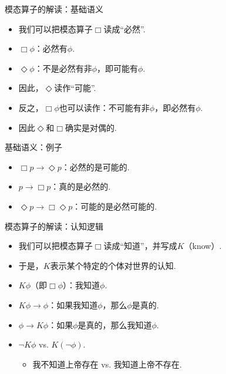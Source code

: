     \begin{frame}{模态算子的解读：基础语义}
    \begin{itemize}
        \item 我们可以把模态算子$\Box$读成“必然”.
        \item $\Box\phi$：必然有$\phi$.
        \item $\Diamond\phi$：不是必然有非$\phi$，即可能有$\phi$.
        \item 因此，$\Diamond$读作“可能”.
        \item 反之，$\Box\phi$也可以读作：不可能有非$\phi$，即必然有$\phi$.
        \item 因此$\Diamond$和$\Box$确实是对偶的.
    \end{itemize}
    \end{frame}
    \begin{frame}{基础语义：例子}
    \begin{itemize}
        \item $\Box p\to\Diamond p$：必然的是可能的.
        \item $p\to\Box p$：真的是必然的.
        \item $\Diamond p\to\Box\Diamond p$：可能的是必然可能的.
    \end{itemize}
    \end{frame}
    \begin{frame}{模态算子的解读：认知逻辑}
    \begin{itemize}
        \item 我们可以把模态算子$\Box$读成“知道”，并写成$K$（know）.
        \item 于是，$K$表示某个特定的个体对世界的认知.
        \item $K\phi$（即$\Box\phi$）：我知道$\phi$.
        \item $K\phi\to\phi$：如果我知道$\phi$，那么$\phi$是真的.
        \item $\phi\to K\phi$：如果$\phi$是真的，那么我知道$\phi$.
        \item $\neg K\phi$ vs. $K(\neg\phi)$.
        \begin{itemize}
            \item 我不知道上帝存在 vs. 我知道上帝不存在.
        \end{itemize}
    \end{itemize}
    \end{frame}
    \newcommand{\PA}{\mathbf{PA}}
